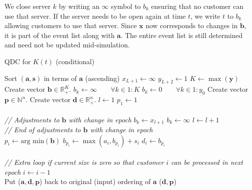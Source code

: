 \documentclass[article]{jss}
\begin{document}
We close server $k$ by writing an $\infty$ symbol to $b_k$ ensuring that no customer can use that server. If the server needs to be open again at time $t$, we write $t$ to $b_k$ allowing customers to use that server. Since $\mathbf{x}$ now corresponds to changes in $\mathbf{b}$, it is part of the event list along with $\mathbf{a}$. The entire event list is still determined and need not be updated mid-simulation. 

\begin{algorithm}[!ht]
\caption{QDC for $K(t)$ (conditional)}
\label{alg:changing_servers}
\footnotesize
\begin{algorithmic}[1]
\State Sort $(\mathbf{a}, \mathbf{s})$ in terms of $\mathbf{a}$ (ascending)
\State $x_{L+1} \leftarrow \infty$
\State $y_{L+2} \leftarrow 1$
\State $K \leftarrow \max(\mathbf{y})$
\State Create vector $\mathbf{b} \in \mathbb{R}_{\text{+}}^{K}$. 
\State $b_k \leftarrow \infty \quad \quad \forall k \in 1:K $
\State $b_k \leftarrow 0 \quad \quad \forall k \in 1:y_0 $
\State Create vector $\mathbf{p} \in \mathbb{N}^{n}$.
\State Create vector $\mathbf{d} \in \mathbb{R}_{+}^{n}$.
\State $l \leftarrow 1$
\State $p_1 \leftarrow 1$ 
 \\ \\

\hspace{10mm} \textit{// Adjustments to $\mathbf{b}$ with change in epoch}
      	\State $b_k \leftarrow x_{l+1}$ 
      \EndFor
    \EndIf
        \State $b_k \leftarrow \infty$ 
      \EndFor
    \EndIf
    \State $l \leftarrow l + 1$
  \EndIf \\ 
 \hspace{10mm} \textit{// End of adjustments to $\mathbf{b}$ with change in epoch} \\
  \State $p_i \leftarrow \text{arg min}(\mathbf{b}) $
  \State $b_{p_i} \leftarrow \max(a_i, b_{p_i}) + s_i $
  \State $d_i \leftarrow b_{p_i}$ \\ \\
\hspace{10mm} \textit{// Extra loop if current size is zero so that customer $i$ can be processed in next epoch}
  	\State $i \leftarrow i - 1$
  \EndIf \\
\EndFor 
\State Put ($\mathbf{a}, \mathbf{d}, \mathbf{p}$) back to original (input) ordering of $\mathbf{a}$ 
\State \Return ($\mathbf{d}, \mathbf{p}$)
\EndFunction
\end{algorithmic}
\end{algorithm}
\end{document}
